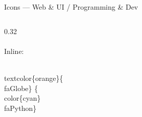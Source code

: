 \documentclass[presentation, aspectratio=169]{beamer}
\begin{document}
\begin{frame}[fragile]{Icons --- Web \& UI / Programming \& Dev}
\begin{columns}[t, onlytextwidth]
\begin{column}{0.32\textwidth}
      \textcolor{red}{}\\[0.15em]
      \textcolor{green}{}\\[0.5em]
      {\small Inline: \textcolor{yellow}{\faStar}\,%
      \textcolor{plum}{\faStar}\,%
      \textcolor{petrol}{\faStar}}\\[0.4em]
      \begin{codeblock}
\\textcolor\{orange\}\{\\faGlobe\}
\{\\color\{cyan\}\\faPython\}
      \end{codeblock}
    \end{column}
  \end{columns}
\end{frame}
\end{document}
